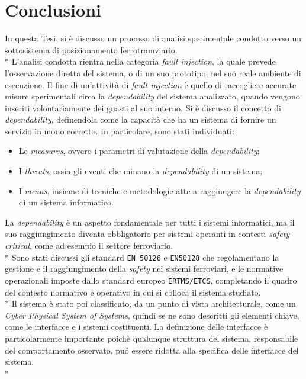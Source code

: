 \chapter{Conclusioni}
In questa Tesi, si \`e discusso un processo di analisi sperimentale condotto verso un sottosistema di posizionamento ferrotramviario.\\*
L'analisi condotta rientra nella categoria \emph{fault injection}, la quale prevede l'osservazione diretta del sistema, o di un suo prototipo, nel suo reale ambiente di esecuzione. Il fine di un'attivit\`a di \emph{fault injection} \`e quello di raccogliere accurate misure sperimentali circa la \emph{dependability} del sistema analizzato, quando vengono inseriti volontariamente dei guasti al suo interno. Si \`e discusso il concetto di \emph{dependability}, definendola come la capacit\`a che ha un sistema di fornire un servizio in modo corretto. In particolare, sono stati individuati:
\begin{itemize}
	\item Le \emph{measures}, ovvero i parametri di valutazione della \emph{dependability};
	\item I \emph{threats}, ossia gli eventi che minano la \emph{dependability} di un sistema;
	\item I \emph{means}, insieme di tecniche e metodologie atte a raggiungere la \emph{dependability} di un sistema informatico.
\end{itemize}
La \emph{dependability} \`e un aspetto fondamentale per tutti i sistemi informatici, ma il suo raggiungimento diventa obbligatorio per sistemi operanti in contesti \emph{safety critical}, come ad esempio il settore ferroviario.\\*
Sono stati discussi gli standard \texttt{EN 50126} e \texttt{EN50128} che regolamentano la gestione e il raggiungimento della \emph{safety} nei sistemi ferroviari, e le normative operazionali imposte dallo standard europeo \texttt{ERTMS/ETCS}, completando il quadro del contesto normativo e operativo in cui si colloca il sistema studiato.\\*
Il sistema \`e stato poi classificato, da un punto di vista architetturale, come un \emph{Cyber Physical System of Systems}, quindi se ne sono descritti gli elementi chiave, come le interfacce e i sistemi costituenti. La definizione delle interfacce \`e particolarmente importante poich\`e qualunque struttura del sistema, responsabile del comportamento osservato, pu\'o essere ridotta alla specifica delle interfacce del sistema.\\*
